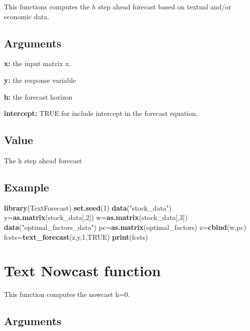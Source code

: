 \documentclass[]{article}
\newenvironment{Shaded}{\begin{snugshade}}{\end{snugshade}}
\newcommand{\KeywordTok}[1]{\textcolor[rgb]{0.13,0.29,0.53}{\textbf{#1}}}
\newcommand{\DecValTok}[1]{\textcolor[rgb]{0.00,0.00,0.81}{#1}}
\newcommand{\StringTok}[1]{\textcolor[rgb]{0.31,0.60,0.02}{#1}}
\newcommand{\OtherTok}[1]{\textcolor[rgb]{0.56,0.35,0.01}{#1}}
\newcommand{\NormalTok}[1]{#1}
\begin{document}
This functions computes the \(h\) step ahead forecast based on textual
and/or economic data.

\subsection{Arguments}\label{arguments-8}

\textbf{x:} the input matrix x.

\textbf{y:} the response variable

\textbf{h:} the forecast horizon

\textbf{intercept:} TRUE for include intercept in the forecast equation.

\subsection{Value}\label{value-8}

The h step ahead forecast

\subsection{Example}\label{example-8}

\begin{Shaded}
\begin{Highlighting}[]
\KeywordTok{library}\NormalTok{(TextForecast)}
\KeywordTok{set.seed}\NormalTok{(}\DecValTok{1}\NormalTok{)}
\KeywordTok{data}\NormalTok{(}\StringTok{"stock_data"}\NormalTok{)}
\NormalTok{y=}\KeywordTok{as.matrix}\NormalTok{(stock_data[,}\DecValTok{2}\NormalTok{])}
\NormalTok{w=}\KeywordTok{as.matrix}\NormalTok{(stock_data[,}\DecValTok{3}\NormalTok{])}
\KeywordTok{data}\NormalTok{(}\StringTok{"optimal_factors_data"}\NormalTok{)}
\NormalTok{pc=}\KeywordTok{as.matrix}\NormalTok{(optimal_factors)}
\NormalTok{z=}\KeywordTok{cbind}\NormalTok{(w,pc)}
\NormalTok{fcsts=}\KeywordTok{text_forecast}\NormalTok{(z,y,}\DecValTok{1}\NormalTok{,}\OtherTok{TRUE}\NormalTok{)}
\KeywordTok{print}\NormalTok{(fcsts)}
\end{Highlighting}
\end{Shaded}

\section{Text Nowcast function}\label{text-nowcast-function}

This function computes the nowcast h=0.

\subsection{Arguments}\label{arguments-9}
\end{document}
